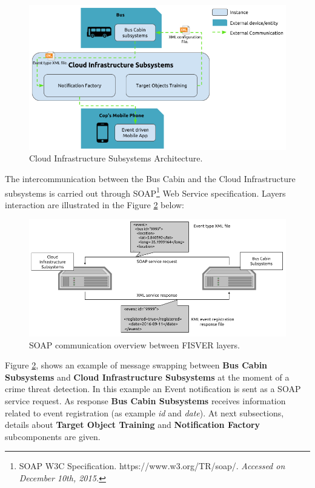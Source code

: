 \begin{figure}[htb!]
 	\centering
 	\includegraphics[scale=0.65]{Imagens/cap4_cloud_infra.png}
 	\caption{Cloud Infrastructure Subsystems Architecture.}
 	\label{fig:cloud_infra}
\end{figure}

The intercommunication between the Bus Cabin and the Cloud Infrastructure subsystems is carried out through SOAP\footnote[21]{SOAP W3C Specification. https://www.w3.org/TR/soap/. \textit{Accessed on December 10th, 2015.}} Web Service specification. Layers interaction are illustrated in the Figure \ref{fig:soap} below:

\begin{figure}[htb!]
  \centering
  \includegraphics[scale=0.50]{Imagens/cap4_soap_arq.png}
  \caption{SOAP communication overview between FISVER layers.}
  \label{fig:soap}
\end{figure}

Figure \ref{fig:soap}, shows an example of message swapping between \textbf{Bus Cabin Subsystems} and \textbf{Cloud Infrastructure Subsystems} at the moment of a crime threat detection. In this example an Event notification is sent as a SOAP service request. As response \textbf{Bus Cabin Subsystems} receives information related to event registration (as example \textit{id} and \textit{date}). At next subsections, details about \textbf{Target Object Training} and \textbf{Notification Factory} subcomponents are given.

